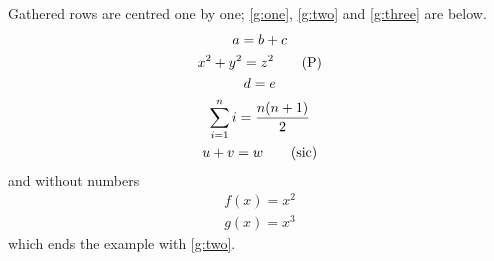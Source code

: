 \documentclass{article}
\begin{document}
Gathered rows are centred one by one; \eqref{g:one}, \eqref{g:two} and \eqref{g:three} are below.
\begin{gather}
a = b + c \label{g:one} \\
x^2 + y^2 = z^2 \tag{P} \label{g:two} \\
d = e \notag \\
\sum_{i=1}^n i = \frac{n(n+1)}{2} \label{g:three} \\
u + v = w \tag*{(sic)}
\end{gather}
and without numbers
\begin{gather*}
f(x) = x^2 \tag{$\dagger$} \\
g(x) = x^3
\end{gather*}
which ends the example with \eqref{g:two}.
\end{document}
